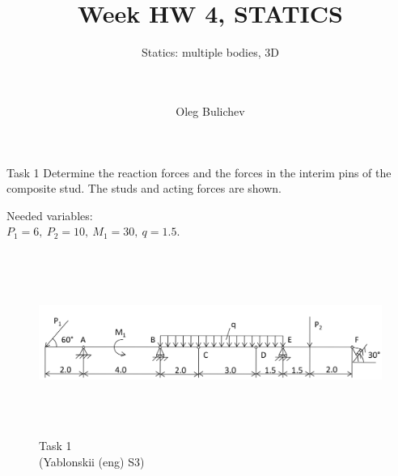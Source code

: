\documentclass[aspectratio=169]{beamer}
\title[Theoretical Mechanics]{Week HW 4, STATICS} %
\subtitle{ Statics: multiple bodies, 3D \\
\ \\ \
         } %
\author{Oleg Bulichev}
\newcommand{\fbckg}[1]{\usebackgroundtemplate{\texttt{[image: \#1]}}}%
\begin{document}
\setlength{\abovedisplayskip}{0pt}
\setlength{\belowdisplayskip}{0pt}
\setlength{\abovedisplayshortskip}{0pt}
\setlength{\belowdisplayshortskip}{0pt}

\fbckg{fibeamer/figs/title_page.png}

\fbckg{fibeamer/figs/common.png}

\begin{frame}[t]{Task 1}
    Determine the reaction forces and the forces in the interim pins of the composite stud. The studs and acting forces are shown.

    Needed variables:\\
    $P_1=6,\ P_2=10,\ M_1=30,\ q=1.5$.
    \vspace{-0.4cm}
    \begin{figure}[H]
      \centering\includegraphics[height=6cm,width=1\textwidth,keepaspectratio]{HW4_1}
      \caption*{Task 1\\ (Yablonskii (eng) S3)}
    \end{figure}
\end{frame}
\end{document}

